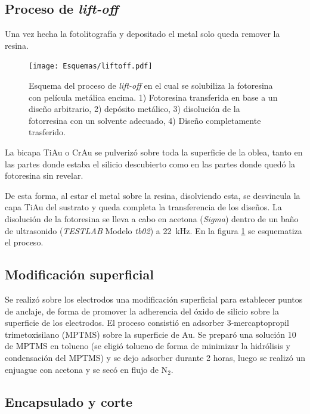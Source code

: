 	\subsection{Proceso de\textit{ lift-off}}
			Una vez hecha la fotolitografía y depositado el metal solo queda remover la resina.
					\begin{figure}[!ht]
							  \begin{center}
							  \texttt{[image: Esquemas/liftoff.pdf]}
							  \caption[Esquema del proceso de\textit{ lift-off}]{Esquema del proceso de\textit{ lift-off} en el cual se solubiliza la fotoresina con película metálica encima. 1) Fotoresina transferida en base a un diseño arbitrario, 2) depósito metálico, 3) disolución de la fotorresina con un solvente adecuado, 4) Diseño completamente trasferido.}
							  \label{esq:liftoff}
							  \end{center}
							  \end{figure}

		 La bicapa Ti\textbar Au o Cr\textbar Au se pulverizó sobre toda la superficie de la oblea, tanto en las partes donde estaba el silicio descubierto como en las partes donde quedó la fotoresina sin revelar. 
			
		De esta forma, al estar el metal sobre la resina, disolviendo esta, se desvincula la capa Ti\textbar Au del sustrato y queda completa la transferencia de los diseños. 
		La disolución de la fotoresina se lleva a cabo en acetona (\textit{Sigma}) dentro de un baño de ultrasonido (\textit{TESTLAB} Modelo \textit{tb02}) a \SI{22}{\kHz}. En la figura \ref{esq:liftoff} se esquematiza el proceso.

	\subsection{Modificación superficial}\label{sec:silanizacion}
		
	Se realizó sobre los electrodos una modificación superficial para establecer puntos de anclaje, de forma de promover la adherencia del óxido de silicio sobre la superficie de los electrodos.
	El proceso consistió en adsorber 3-mercaptopropil trimetoxisilano (MPTMS) sobre la superficie de Au. Se preparó una solución \SI{10}{\milli\Molar} de MPTMS en tolueno (se eligió tolueno de forma de minimizar la hidrólisis y condensación del MPTMS) y se dejo adsorber durante 2 horas, luego se realizó un enjuague con acetona y se secó en flujo de N$_2$.

	\subsection{Encapsulado y corte}\label{sec:corte}

